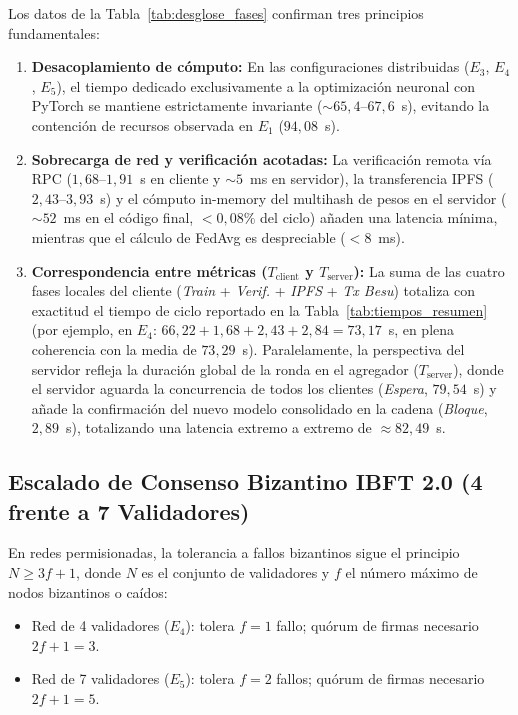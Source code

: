 Los datos de la Tabla~\ref{tab:desglose_fases} confirman tres principios fundamentales:
\begin{enumerate}
    \item \textbf{Desacoplamiento de cómputo:} En las configuraciones distribuidas ($E_3$, $E_4$, $E_5$), el tiempo dedicado exclusivamente a la optimización neuronal con PyTorch se mantiene estrictamente invariante ($\sim 65,4\text{--}67,6$~s), evitando la contención de recursos observada en $E_1$ ($94,08$~s).
    \item \textbf{Sobrecarga de red y verificación acotadas:} La verificación remota vía RPC ($1,68\text{--}1,91$~s en cliente y $\sim 5$~ms en servidor), la transferencia IPFS ($2,43\text{--}3,93$~s) y el cómputo in-memory del multihash de pesos en el servidor ($\sim 52$~ms en el código final, $<0{,}08\%$ del ciclo) añaden una latencia mínima, mientras que el cálculo de FedAvg es despreciable ($< 8$~ms).
    \item \textbf{Correspondencia entre métricas ($T_{\text{client}}$ y $T_{\text{server}}$):} La suma de las cuatro fases locales del cliente (\textit{Train} + \textit{Verif.} + \textit{IPFS} + \textit{Tx Besu}) totaliza con exactitud el tiempo de ciclo reportado en la Tabla~\ref{tab:tiempos_resumen} (por ejemplo, en $E_4$: $66{,}22 + 1{,}68 + 2{,}43 + 2{,}84 = 73{,}17$~s, en plena coherencia con la media de $73{,}29$~s). Paralelamente, la perspectiva del servidor refleja la duración global de la ronda en el agregador ($T_{\text{server}}$), donde el servidor aguarda la concurrencia de todos los clientes (\textit{Espera}, $79{,}54$~s) y añade la confirmación del nuevo modelo consolidado en la cadena (\textit{Bloque}, $2{,}89$~s), totalizando una latencia extremo a extremo de $\approx 82{,}49$~s.
\end{enumerate}

\subsection{Escalado de Consenso Bizantino IBFT 2.0 (4 frente a 7 Validadores)}
En redes permisionadas, la tolerancia a fallos bizantinos sigue el principio $N \ge 3f + 1$, donde $N$ es el conjunto de validadores y $f$ el número máximo de nodos bizantinos o caídos:
\begin{itemize}
    \item Red de 4 validadores ($E_4$): tolera $f=1$ fallo; quórum de firmas necesario $2f+1 = 3$.
    \item Red de 7 validadores ($E_5$): tolera $f=2$ fallos; quórum de firmas necesario $2f+1 = 5$.
\end{itemize}

